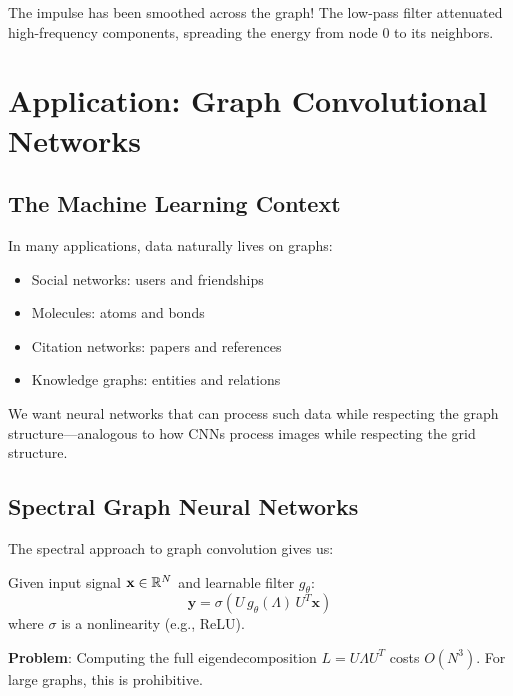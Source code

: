 \begin{notechapter}
\begin{example}
The impulse has been smoothed across the graph! The low-pass filter 
attenuated high-frequency components, spreading the energy from node 0 
to its neighbors.
\end{example}

\section{Application: Graph Convolutional Networks}

\subsection{The Machine Learning Context}

In many applications, data naturally lives on graphs:
\begin{itemize}
\item Social networks: users and friendships
\item Molecules: atoms and bonds
\item Citation networks: papers and references
\item Knowledge graphs: entities and relations
\end{itemize}

We want neural networks that can process such data while respecting 
the graph structure---analogous to how CNNs process images while 
respecting the grid structure.

\subsection{Spectral Graph Neural Networks}

The spectral approach to graph convolution gives us:

\begin{definition}
Given input signal $\mathbf{x} \in \mathbb{R}^N$ and learnable filter 
$g_\theta$:
\begin{equation}
\mathbf{y} = \sigma\left( U \, g_\theta(\Lambda) \, U^T \mathbf{x} 
             \right)
\end{equation}
where $\sigma$ is a nonlinearity (e.g., ReLU).
\end{definition}

\textbf{Problem}: Computing the full eigendecomposition 
$L = U\Lambda U^T$ costs $O(N^3)$. For large graphs, this is 
prohibitive.


\end{notechapter}
